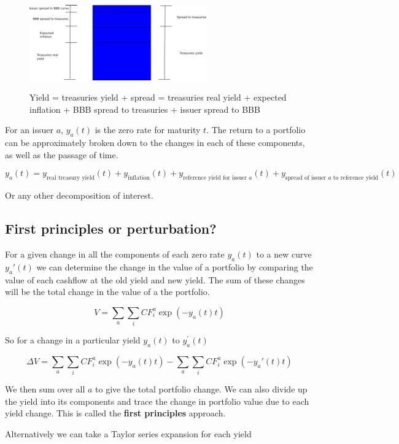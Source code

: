 \begin{figure}[htbp]
\begin{center}
  \includegraphics[width=3in]{pics/yCurveDec2.png} \\
  \caption{Yield = treasuries yield + spread = treasuries real yield + expected inflation + BBB spread to treasuries + issuer spread to BBB}
\label{yCurveDec1}
\end{center}
\end{figure}

For an issuer $a$, $y_a(t)$ is the zero rate for maturity $t$. The return to a portfolio can be approximately broken down to the changes in each of these components, as well as the passage of time.

\[y_a(t) = y_{\textrm{real treasury yield}}(t) + y_{\textrm{inflation}}(t) + y_{\textrm{reference yield for issuer $a$}}(t) + y_{\textrm{spread of issuer $a$ to reference yield}}(t)\]

Or any other decomposition of interest. 


\subsection{First principles or perturbation?}
For a given change in all the components of each zero rate $y_a(t)$ to a new curve $y_a'(t)$ we can determine the change in the value of a portfolio by comparing the value of each cashflow at the old yield and new yield. The sum of these changes will be the total change in the value of a the portfolio. 

\[ V = \sum_a \sum_i CF_i^a \exp(-y_a(t)t)\]

So for a change in a particular yield $y_a(t)$ to $y_a^{'}(t)$ 

\[ \Delta V = \sum_a \sum_i CF_i^a \exp(-y_a(t)t) - \sum_a \sum_i CF_i^a \exp(-y_a'(t)t)  \]

We then sum over all $a$ to give the total portfolio change. We can also divide up the yield into its components and trace the change in portfolio value due to each yield change. This is called the \textbf{first principles} approach.

Alternatively we can take a Taylor series expansion for each yield

